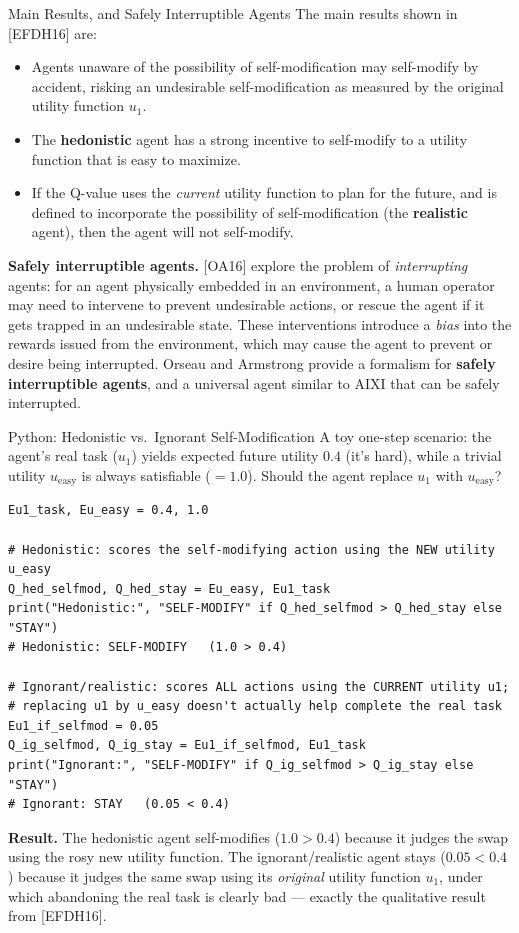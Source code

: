 \documentclass[aspectratio=169,10pt]{beamer}
\begin{document}
\begin{frame}{Main Results, and Safely Interruptible Agents}
  The main results shown in [EFDH16] are:
  \begin{itemize}
    \item Agents unaware of the possibility of self-modification may
      self-modify by accident, risking an undesirable self-modification
      as measured by the original utility function $u_1$.
    \item The \textbf{hedonistic} agent has a strong incentive to
      self-modify to a utility function that is easy to maximize.
    \item If the Q-value uses the \emph{current} utility function to plan
      for the future, and is defined to incorporate the possibility of
      self-modification (the \textbf{realistic} agent), then the agent
      will not self-modify.
  \end{itemize}

  \vspace{0.4em}
  \textbf{Safely interruptible agents.} [OA16] explore the problem of
  \emph{interrupting} agents: for an agent physically embedded in an
  environment, a human operator may need to intervene to prevent
  undesirable actions, or rescue the agent if it gets trapped in an
  undesirable state. These interventions introduce a \emph{bias} into the
  rewards issued from the environment, which may cause the agent to
  prevent or desire being interrupted. Orseau and Armstrong provide a
  formalism for \textbf{safely interruptible agents}, and a universal
  agent similar to AIXI that can be safely interrupted.
\end{frame}

\begin{frame}[fragile]{Python: Hedonistic vs.\ Ignorant Self-Modification}
  A toy one-step scenario: the agent's real task ($u_1$) yields expected
  future utility $0.4$ (it's hard), while a trivial utility $u_{\text{easy}}$
  is always satisfiable ($=1.0$). Should the agent replace $u_1$ with
  $u_{\text{easy}}$?
  \begin{lstlisting}
Eu1_task, Eu_easy = 0.4, 1.0

# Hedonistic: scores the self-modifying action using the NEW utility u_easy
Q_hed_selfmod, Q_hed_stay = Eu_easy, Eu1_task
print("Hedonistic:", "SELF-MODIFY" if Q_hed_selfmod > Q_hed_stay else "STAY")
# Hedonistic: SELF-MODIFY   (1.0 > 0.4)

# Ignorant/realistic: scores ALL actions using the CURRENT utility u1;
# replacing u1 by u_easy doesn't actually help complete the real task
Eu1_if_selfmod = 0.05
Q_ig_selfmod, Q_ig_stay = Eu1_if_selfmod, Eu1_task
print("Ignorant:", "SELF-MODIFY" if Q_ig_selfmod > Q_ig_stay else "STAY")
# Ignorant: STAY   (0.05 < 0.4)
  \end{lstlisting}
  \textbf{Result.} The hedonistic agent self-modifies ($1.0>0.4$) because
  it judges the swap using the rosy new utility function. The
  ignorant/realistic agent stays ($0.05<0.4$) because it judges the same
  swap using its \emph{original} utility function $u_1$, under which
  abandoning the real task is clearly bad --- exactly the qualitative
  result from [EFDH16].
\end{frame}
\end{document}
